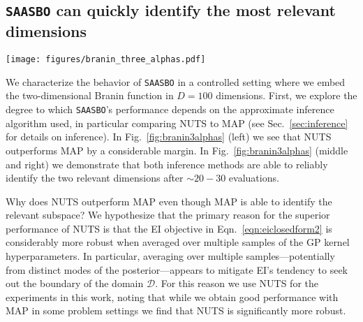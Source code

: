 \documentclass[accepted]{uai2021} %
\newcommand{\algoname}{{\texttt {SAASBO}}}
\newcommand{\DD}{\mathcal{D}}
\begin{document}
\subsection{\algoname{} can quickly identify the most relevant dimensions}
\label{sec:relevance}
\begin{figure*}[!ht]
    \centering
    \texttt{[image: figures/branin\_three\_alphas.pdf]}
    \caption{We explore how \algoname{} performs on Branin ($D=100$), comparing
    \algoname-\texttt{NUTS} for three values of the sparsity controlling
    hyperparameter $\alpha$ to \algoname-\texttt{MAP}.
    Each curve corresponds to $60$ independent replications of Algorithm \ref{algo}.
    {\bf Left}: We compare performance w.r.t.~the best minimum found (the mean is depicted by a thick line and
    shaded bands denote standard errors).
    {\bf Middle}: We depict the mean number of \emph{relevant} dimensions found, where
    a relevant dimension is declared `found' if its corresponding $\rm{PosteriorMedian}(\rho_k)$
    is among the two largest $\{ \rm{PosteriorMedian}(\rho_i) \}_{i=1}^D$.
    {\bf Right}: We depict the mean effective subspace dimension, defined to be the number of dimensions
    for which ${\rm{PosteriorMedian}(\rho_k) > 0.5}$.}
    \label{fig:branin3alphas}
\end{figure*}

We characterize the behavior
of \algoname{} in a controlled setting where we embed the two-dimensional Branin function in $D=100$ dimensions.
First, we explore the degree to which \algoname's performance depends on the approximate inference algorithm used,
in particular comparing NUTS to MAP (see Sec.~\ref{sec:inference} for details on inference).
In Fig.~\ref{fig:branin3alphas} (left) we see that NUTS outperforms MAP by a considerable margin.
In Fig.~\ref{fig:branin3alphas} (middle and right) we demonstrate that both inference methods
are able to reliably identify the two relevant dimensions after $\sim 20-30$ evaluations.

Why does NUTS outperform MAP even though MAP is able to identify the relevant subspace?
We hypothesize that the primary reason for the superior performance of NUTS is that the EI objective
in Eqn.~\eqref{eqn:eiclosedform2} is considerably more robust when averaged over multiple samples of the
GP kernel hyperparameters. In particular, averaging over multiple samples---potentially from
distinct modes of the posterior---appears to mitigate EI's tendency to seek out the boundary of the domain $\DD$.
For this reason we use NUTS for the experiments in this work, noting that while we obtain good performance with MAP in some problem
settings we find that NUTS is significantly more robust.
\end{document}
